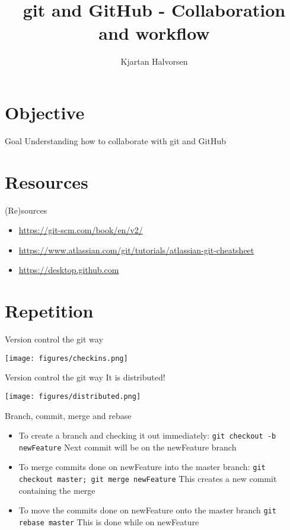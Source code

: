 \documentclass[presentation,aspectratio=1610]{beamer}
\author{Kjartan Halvorsen}
\date{}
\title{git and GitHub - Collaboration and workflow}
\begin{document}
\maketitle


\section{Objective}
\label{sec-1}
\begin{frame}[label=sec-1-1]{Goal}
\alert{Understanding how to collaborate with git and GitHub}
\end{frame}

\section{Resources}
\label{sec-2}
\begin{frame}[label=sec-2-1]{(Re)sources}
\begin{itemize}
\item \url{https://git-scm.com/book/en/v2/}
\item \url{https://www.atlassian.com/git/tutorials/atlassian-git-cheatsheet}
\item \url{https://desktop.github.com}
\end{itemize}
\end{frame}

\section{Repetition}
\label{sec-3}
\begin{frame}[label=sec-3-1]{Version control the git way}
\begin{center}
\texttt{[image: figures/checkins.png]}
\end{center}
\end{frame}

\begin{frame}[label=sec-3-2]{Version control the git way}
It is \alert{distributed}!

\begin{center}
\texttt{[image: figures/distributed.png]}
\end{center}
\end{frame}

\begin{frame}[fragile,label=sec-3-3]{Branch, commit, merge and rebase}
 \begin{itemize}
\item To create a branch and checking it out immediately:
\texttt{git checkout -b newFeature}
Next commit will be on the newFeature branch
\item To merge commits done on newFeature into the master branch:
\texttt{git checkout master; git merge newFeature}
This creates a new commit containing the merge
\item To move the commits done on newFeature onto the master branch
\texttt{git rebase master}
This is  done while on newFeature
\end{itemize}
\end{frame}
\end{document}
